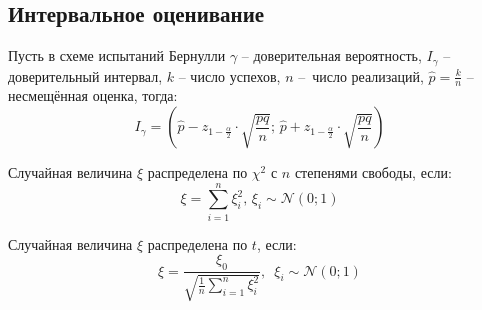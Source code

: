 \documentclass[12pt]{article}
\begin{document}
\subsection{Интервальное оценивание}

\begin{statement}
    Пусть в схеме испытаний Бернулли $\gamma$ – доверительная вероятность, $I_\gamma$ – доверительный интервал, $k$ – число успехов, $n$ – число реализаций, $\hat{p}=\frac{k}{n}$ – несмещённая оценка, тогда:
    $$I_\gamma=\left(\hat{p}-z_{1-\frac{\alpha}{2}}\cdot\sqrt{\frac{pq}{n}};\,\hat{p}+z_{1-\frac{\alpha}{2}}\cdot\sqrt{\frac{pq}{n}}\right)$$
\end{statement}

\begin{definition}
    Случайная величина $\xi$ распределена по $\chi^2$ с $n$ степенями свободы, если:
    $$\xi=\sum_{i=1}^{n}\xi_i^2,\,\xi_i\sim\mathcal{N}(0;1)$$
\end{definition}
\begin{definition}
    Случайная величина $\xi$ распределена по $t$, если:
    $$\xi=\dfrac{\xi_0}{\sqrt{\frac{1}{n}\sum\limits_{i=1}^{n}\xi_i^2}},\enspace\xi_i\sim\mathcal{N}(0;1)$$
\end{definition}
\end{document}
